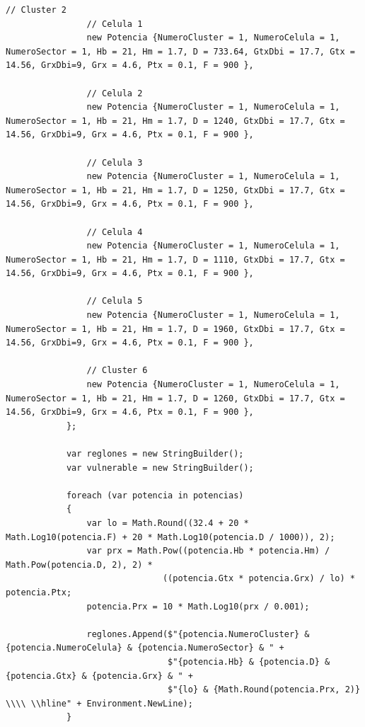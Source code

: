 \documentclass[11pt,letterpaper]{article}
\begin{document}
\begin{lstlisting}[style=CStyle]
                // Cluster 2
                // Celula 1
                new Potencia {NumeroCluster = 1, NumeroCelula = 1, NumeroSector = 1, Hb = 21, Hm = 1.7, D = 733.64, GtxDbi = 17.7, Gtx = 14.56, GrxDbi=9, Grx = 4.6, Ptx = 0.1, F = 900 },

                // Celula 2
                new Potencia {NumeroCluster = 1, NumeroCelula = 1, NumeroSector = 1, Hb = 21, Hm = 1.7, D = 1240, GtxDbi = 17.7, Gtx = 14.56, GrxDbi=9, Grx = 4.6, Ptx = 0.1, F = 900 },

                // Celula 3
                new Potencia {NumeroCluster = 1, NumeroCelula = 1, NumeroSector = 1, Hb = 21, Hm = 1.7, D = 1250, GtxDbi = 17.7, Gtx = 14.56, GrxDbi=9, Grx = 4.6, Ptx = 0.1, F = 900 },

                // Celula 4
                new Potencia {NumeroCluster = 1, NumeroCelula = 1, NumeroSector = 1, Hb = 21, Hm = 1.7, D = 1110, GtxDbi = 17.7, Gtx = 14.56, GrxDbi=9, Grx = 4.6, Ptx = 0.1, F = 900 },

                // Celula 5
                new Potencia {NumeroCluster = 1, NumeroCelula = 1, NumeroSector = 1, Hb = 21, Hm = 1.7, D = 1960, GtxDbi = 17.7, Gtx = 14.56, GrxDbi=9, Grx = 4.6, Ptx = 0.1, F = 900 },

                // Cluster 6
                new Potencia {NumeroCluster = 1, NumeroCelula = 1, NumeroSector = 1, Hb = 21, Hm = 1.7, D = 1260, GtxDbi = 17.7, Gtx = 14.56, GrxDbi=9, Grx = 4.6, Ptx = 0.1, F = 900 },
            };

            var reglones = new StringBuilder();
            var vulnerable = new StringBuilder();

            foreach (var potencia in potencias)
            {
                var lo = Math.Round((32.4 + 20 * Math.Log10(potencia.F) + 20 * Math.Log10(potencia.D / 1000)), 2);
                var prx = Math.Pow((potencia.Hb * potencia.Hm) / Math.Pow(potencia.D, 2), 2) *
                               ((potencia.Gtx * potencia.Grx) / lo) * potencia.Ptx;
                potencia.Prx = 10 * Math.Log10(prx / 0.001);

                reglones.Append($"{potencia.NumeroCluster} & {potencia.NumeroCelula} & {potencia.NumeroSector} & " +
                                $"{potencia.Hb} & {potencia.D} & {potencia.Gtx} & {potencia.Grx} & " +
                                $"{lo} & {Math.Round(potencia.Prx, 2)} \\\\ \\hline" + Environment.NewLine);
            }


\end{lstlisting}
\end{document}
